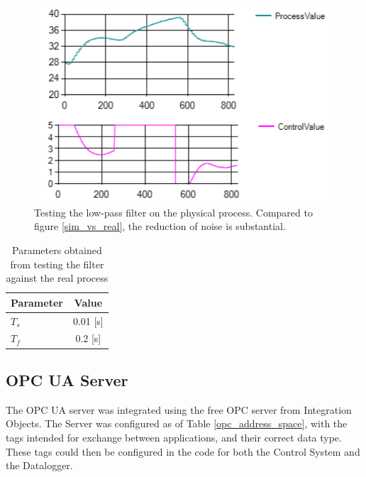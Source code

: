 \documentclass[conference]{IEEEtran}
\begin{document}
\begin{figure}[H]
    \centering
    \includegraphics[scale=0.8]{media/anti_windup_cut.png}
    \caption{Testing the low-pass filter on the physical process. Compared to figure \ref{sim_vs_real}, the reduction of noise is substantial.}
    \label{anti_windup_cut}
\end{figure}

\begin{table}[H]
    \centering
    \begin{tabular}{ |l|c| }
        \hline
        Parameter & Value \\ 
        \hline \hline
        $T_s$ & 0.01 [s]\\
        $T_f$ & 0.2 [s]\\
        \hline
    \end{tabular}
    \vspace{5pt}
    \caption{Parameters obtained from testing the filter against the real process}
    \label{filter_params}
\end{table}

\subsection{OPC UA Server}
The OPC UA server was integrated using the free OPC server from Integration Objects. The Server was configured as of Table \ref{opc_address_space}, with the tags intended for exchange between applications, and their correct data type. These tags could then be configured in the code for both the Control System and the Datalogger.
\end{document}
